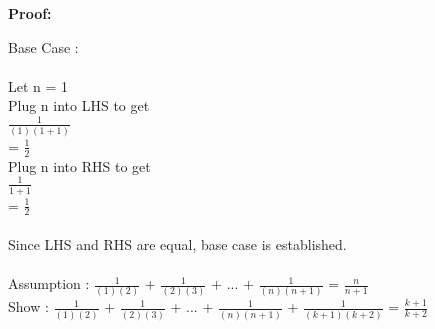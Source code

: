 \documentclass[12pt]{article}
\begin{document}
\par
\bigskip
{\bf Proof:}
\par
Base Case : \\
\\
	Let n = 1 \\
	Plug n into LHS to get \\
	$\frac{1}{(1)(1+1)}$ \\
	= $\frac{1}{2}$ \\
	Plug n into RHS to get \\
	$\frac{1}{1+1}$ \\
	= $\frac{1}{2}$\\
	\\
Since LHS and RHS are equal, base case is established. \\
\\

Assumption : $\frac{1}{(1)(2)}$ + $\frac{1}{(2)(3)}$ + ... + $\frac{1}{(n)(n+1)}$ = $\frac{n}{n+1}$ \\
Show : $\frac{1}{(1)(2)}$ + $\frac{1}{(2)(3)}$ + ... + $\frac{1}{(n)(n+1)}$ + $\frac{1}{(k + 1)(k+2)}$ = $\frac{k + 1}{k + 2}$ \\
\end{document}
